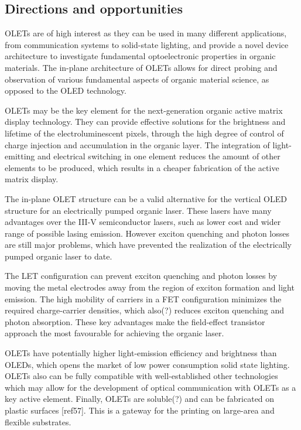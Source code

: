 \subsection{Directions and opportunities} %

OLETs are of high interest as they can be used in many different applications, from communication systems to solid-state lighting, and provide a novel device architecture to investigate fundamental optoelectronic properties in organic materials. The in-plane architecture of OLETs allows for direct probing and observation of various fundamental aspects of organic material science, as opposed to the OLED technology.

OLETs may be the key element for the next-generation organic active matrix display technology. They can provide effective solutions for the brightness and lifetime of the electroluminescent pixels, through the high degree of control of charge injection and accumulation in the organic layer. The integration of light-emitting and electrical switching in one element reduces the amount of other elements to be produced, which results in a cheaper fabrication of the active matrix display.

The in-plane OLET structure can be a valid alternative for the vertical OLED structure for an electrically pumped organic laser. These lasers have many advantages over the III-V semiconductor lasers, such as lower cost and wider range of possible lasing emission. However exciton quenching and photon losses are still major problems, which have prevented the realization of the electrically pumped organic laser to date.

The LET configuration can prevent exciton quenching and photon losses by moving the metal electrodes away from the region of exciton formation and light emission. The high mobility of carriers in a FET configuration minimizes the required charge-carrier densities, which also(?) reduces exciton quenching and photon absorption. These key advantages make the field-effect transistor approach the most favourable for achieving the organic laser.

OLETs have potentially higher light-emission efficiency and brightness than OLEDs, which opens the market of low power consumption solid state lighting. OLETs also can be fully compatible with well-established other technologies which may allow for the development of optical communication with OLETs as a key active element. Finally, OLETs are soluble(?) and can be fabricated on plastic surfaces [ref57]. This is a gateway for the printing on large-area and flexible substrates.
